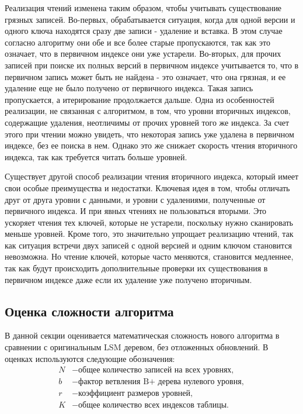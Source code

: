 \documentclass[a4paper,hidelinks,12pt]{article}
\begin{document}
Реализация чтений изменена таким образом, чтобы учитывать существование грязных
записей. Во-первых, обрабатывается ситуация, когда для одной версии и одного
ключа находятся сразу две записи - удаление и вставка. В этом случае согласно
алгоритму они обе и все более старые пропускаются, так как это означает, что в
первичном индексе они уже устарели. Во-вторых, для прочих записей при поиске их
полных версий в первичном индексе учитывается то, что в первичном запись может
быть не найдена - это означает, что она грязная, и ее удаление еще не было
получено от первичного индекса. Такая запись пропускается, а итерирование
продолжается дальше. Одна из особенностей реализации, не связанная с алгоритмом,
в том, что уровни вторичных индексов, содержащие удаления, неотличимы от прочих
уровней того же индекса. За счет этого при чтении можно увидеть, что некоторая
запись уже удалена в первичном индексе, без ее поиска в нем. Однако это же
снижает скорость чтения вторичного индекса, так как требуется читать больше
уровней.

Существует другой способ реализации чтения вторичного индекса, который имеет
свои особые преимущества и недостатки. Ключевая идея в том, чтобы отличать
друг от друга уровни с данными, и уровни с удалениями, полученные от первичного
индекса. И при явных чтениях не пользоваться вторыми. Это ускоряет чтения тех
ключей, которые не устарели, поскольку нужно сканировать меньше уровней. Кроме
того, это значительно упрощает реализацию чтений, так как ситуация встречи
двух записей с одной версией и одним ключом становится невозможна. Но чтение
ключей, которые часто меняются, становится медленнее, так как будут происходить
дополнительные проверки их существования в первичном индексе даже если их
удаление уже получено вторичным.

\subsection{Оценка сложности алгоритма}
В данной секции оценивается математическая сложность нового алгоритма в
сравнении с оригинальным LSM деревом, без отложенных обновлений. В оценках
используются следующие обозначения:
\begin{align*}
N &- \text{общее количество записей на всех уровнях}, \\
b &- \text{фактор ветвления B+ дерева нулевого уровня}, \\
r &- \text{коэффициент размеров уровней}, \\
K &- \text{общее количество всех индексов таблицы}.
\end{align*}
\end{document}
